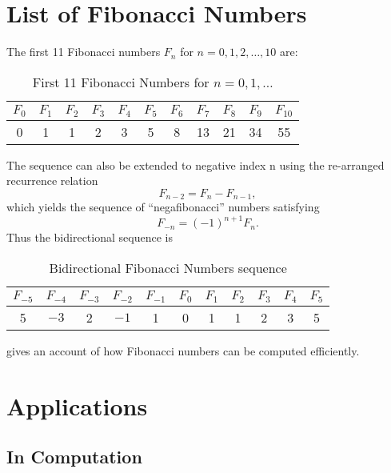 \section{List of Fibonacci Numbers}

The first 11 Fibonacci numbers $F_n$ for $n = 0, 1, 2, \ldots, 10$ are:

\begin{table}[hbt!]\centering
\caption{First 11 Fibonacci Numbers for $n=0,1,\ldots$}
\begin{tabular}{|c|c|c|c|c|c|c|c|c|c|c|}
\hline
$F_0$ & $F_1$ & $F_2$ & $F_3$ & $F_4$ & $F_5$ & $F_6$ & $F_7$ & $F_8$ & $F_9$ & $F_{10}$\\
\hline
0 & 1 & 1 & 2 & 3 & 5 & 8 & 13 & 21 & 34 & 55 \\
\hline
\end{tabular}
\end{table}

The sequence can also be extended to negative index n using the re-arranged recurrence relation
%
\begin{equation}
F_{n-2} = F_n - F_{n-1},
\end{equation}
%
which yields the sequence of ``negafibonacci'' numbers satisfying
%
\begin{equation}
F_{-n} = (-1)^{n+1} F_n.
\end{equation}
%
Thus the bidirectional sequence is
\begin{table}[hbt!]\centering
\caption{Bidirectional Fibonacci Numbers sequence}
\begin{tabular}{|c|c|c|c|c|c|c|c|c|c|c|}
\hline
$F_{-5}$ & $F_{-4}$ & $F_{-3}$ & $F_{-2}$ & $F_{-1}$ & $F_0$ & $F_1$ & $F_2$ & $F_3$ & $F_4$ & $F_5$ \\\hline
5 & $-3$ & 2 & $-1$ & 1 & 0 & 1 & 1 & 2 & 3 & 5\\\hline
\end{tabular}
\end{table}

\citet{Rohl:1989} gives an account of how Fibonacci numbers can be computed efficiently.

\section{Applications}

\subsection{In Computation}


